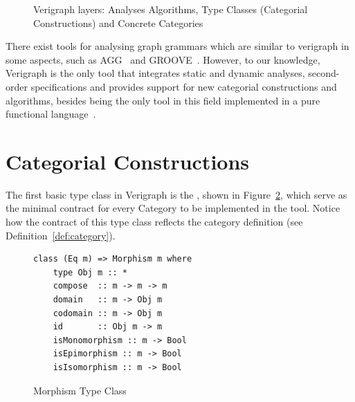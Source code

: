 \begin{figure}[!ht]
  \centering
  \caption{Verigraph layers: Analyses Algorithms, Type Classes (Categorial Constructions) and Concrete Categories}\label{fig:verigraph:layers}
\end{figure}

There exist tools for analysing graph grammars which are similar to verigraph in some aspects, such as AGG~\cite{Taentzer2000} and GROOVE~\cite{Rensink2004}. However, to our knowledge, Verigraph is the only tool that integrates static and dynamic analyses, second-order specifications and provides support for new categorial constructions and algorithms, besides being the only tool in this field implemented in a pure functional language~\cite{Costa2016}.

\section{Categorial Constructions}

The first basic type class in Verigraph is the , shown in Figure~\ref{fig:verigraph:morphism-type-class}, which serve as the minimal contract for every Category to be implemented in the tool. Notice how the contract of this type class reflects the category definition (see Definition~\ref{def:category}).

\begin{figure}[!ht]
\caption{Morphism Type Class}
\begin{verbatim}
class (Eq m) => Morphism m where
    type Obj m :: *
    compose  :: m -> m -> m
    domain   :: m -> Obj m
    codomain :: m -> Obj m
    id       :: Obj m -> m
    isMonomorphism :: m -> Bool
    isEpimorphism :: m -> Bool
    isIsomorphism :: m -> Bool
\end{verbatim}
\label{fig:verigraph:morphism-type-class}
\end{figure}

